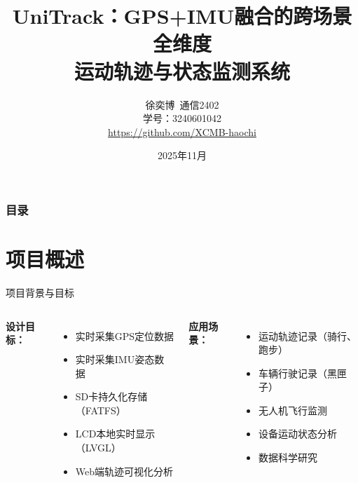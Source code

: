 \documentclass[10pt,aspectratio=169,mathserif]{beamer}
\title{UniTrack：GPS+IMU融合的跨场景全维度\\运动轨迹与状态监测系统}
\author[徐奕博]{
    徐奕博\ 通信2402\\
    学号：3240601042\\
  {\small \url{https://github.com/XCMB-haochi}}}
\date{2025年11月}
\begin{document}
\begin{frame}
    \titlepage
\end{frame}

\begin{frame}
    \frametitle{目录}
    \tableofcontents
\end{frame}

\section{项目概述}

\begin{frame}{项目背景与目标}
    \begin{columns}
    \textbf{设计目标：}
    \begin{itemize}
        \item 实时采集GPS定位数据
        \item 实时采集IMU姿态数据
        \item SD卡持久化存储（FATFS）
        \item LCD本地实时显示（LVGL）
        \item Web端轨迹可视化分析
    \end{itemize}

    \textbf{应用场景：}
    \begin{itemize}
        \item 运动轨迹记录（骑行、跑步）
        \item 车辆行驶记录（黑匣子）
        \item 无人机飞行监测
        \item 设备运动状态分析
        \item 数据科学研究
    \end{itemize}
    \end{columns}
\end{frame}
\end{document}
